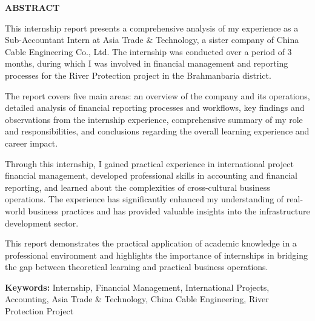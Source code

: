 \vspace*{0.5cm}
{\Huge \textbf{ABSTRACT}}

\vspace{0.5cm}
\begin{minipage}{0.9\textwidth}
    \large
    This internship report presents a comprehensive analysis of my experience as a Sub-Accountant Intern at Asia Trade \& Technology, a sister company of China Cable Engineering Co., Ltd. The internship was conducted over a period of 3 months, during which I was involved in financial management and reporting processes for the River Protection project in the Brahmanbaria district.
    
    \vspace{0.5cm}
    The report covers five main areas: an overview of the company and its operations, detailed analysis of financial reporting processes and workflows, key findings and observations from the internship experience, comprehensive summary of my role and responsibilities, and conclusions regarding the overall learning experience and career impact.
    
    \vspace{0.5cm}
    Through this internship, I gained practical experience in international project financial management, developed professional skills in accounting and financial reporting, and learned about the complexities of cross-cultural business operations. The experience has significantly enhanced my understanding of real-world business practices and has provided valuable insights into the infrastructure development sector.
    
    \vspace{0.5cm}
    This report demonstrates the practical application of academic knowledge in a professional environment and highlights the importance of internships in bridging the gap between theoretical learning and practical business operations.
    
    \vspace{0.5cm}
    \textbf{Keywords:} Internship, Financial Management, International Projects, Accounting, Asia Trade \& Technology, China Cable Engineering, River Protection Project
\end{minipage}
\par\endgroup
